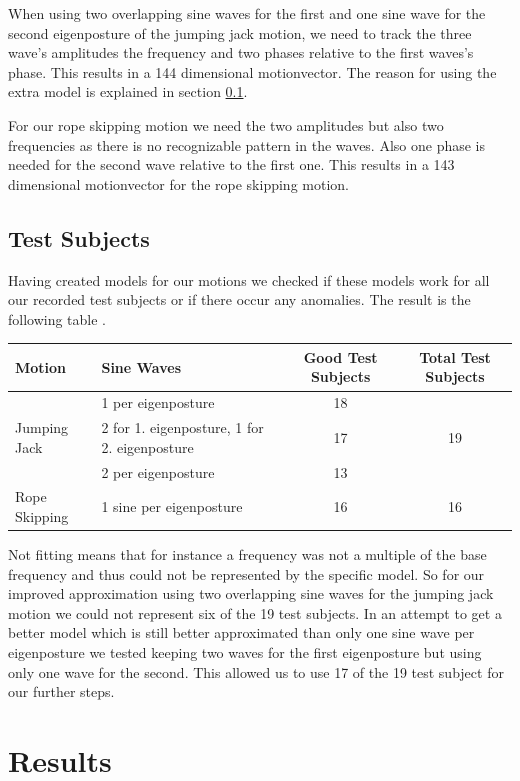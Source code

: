 \documentclass[a4paper]{article}
\begin{document}
When using two overlapping sine waves for the first and one sine wave for the second eigenposture of the jumping jack motion, we need to track the three wave's amplitudes the frequency and two phases relative to the first waves's phase.
This results in a 144 dimensional motionvector.
The reason for using the extra model is explained in section \ref{sec:testsubjects}.

For our rope skipping motion we need the two amplitudes but also two frequencies as there is no recognizable pattern in the waves.
Also one phase is needed for the second wave relative to the first one.
This results in a 143 dimensional motionvector for the rope skipping motion.

\subsection{Test Subjects}
\label{sec:testsubjects}
Having created models for our motions we checked if these models work for all our recorded test subjects or if there occur any anomalies.
The result is the following table .

\begin{center}
\begin{tabular}{l|l|c|c}
Motion & Sine Waves & Good Test Subjects & Total Test Subjects \\
\hline
\multirow{3}{*}{Jumping Jack} & 1 per eigenposture & 18 & \multirow{3}{*}{19} \\ \cline{2-3}
 & 2 for 1. eigenposture, 1 for 2. eigenposture  & 17 \\ \cline{2-3}
 & 2 per eigenposture & 13 \\ \cline{2-3}
\hline
Rope Skipping & 1 sine per eigenposture & 16 & 16 \\
\end{tabular}
\end{center}

Not fitting means that for instance a frequency was not a multiple of the base frequency and thus could not be represented by the specific model.
So for our improved approximation using two overlapping sine waves for the jumping jack motion we could not represent six of the 19 test subjects.
In an attempt to get a better model which is still better approximated than only one sine wave per eigenposture we tested keeping two waves for the first eigenposture but using only one wave for the second.
This allowed us to use 17 of the 19 test subject for our further steps. 

\section{Results}
\end{document}
